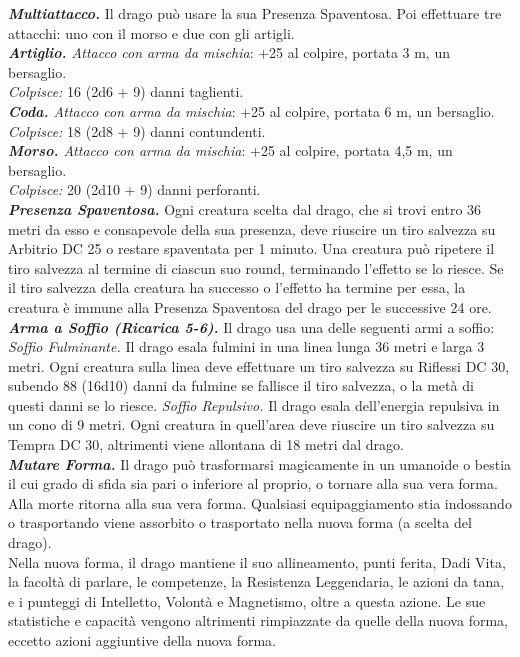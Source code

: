 \begin{multicols}{2}
\emph{\textbf{Multiattacco.}} Il drago può usare la sua Presenza Spaventosa. Poi effettuare tre attacchi: uno con il morso e due con gli artigli.\\
\emph{\textbf{Artiglio.} Attacco con arma da mischia}: +25 al colpire, portata 3 m, un bersaglio.\\
\emph{Colpisce:} 16 (2d6 + 9) danni taglienti.\\
\emph{\textbf{Coda.} Attacco con arma da mischia}: +25 al colpire, portata 6 m, un bersaglio.\\
\emph{Colpisce:} 18 (2d8 + 9) danni contundenti.\\
\emph{\textbf{Morso.} Attacco con arma da mischia}: +25 al colpire, portata 4,5 m, un bersaglio.\\
\emph{Colpisce:} 20 (2d10 + 9) danni perforanti.\\
\emph{\textbf{Presenza Spaventosa.}} Ogni creatura scelta dal drago, che si trovi entro 36 metri da esso e consapevole della sua presenza, deve riuscire un tiro salvezza su Arbitrio DC  25 o restare spaventata per 1 minuto. Una creatura può ripetere il tiro salvezza al termine di ciascun suo round, terminando l'effetto se lo riesce. Se il tiro salvezza della creatura ha successo o l'effetto ha termine per essa, la creatura è immune alla Presenza Spaventosa del drago per le successive 24 ore.\\
\emph{\textbf{Arma a Soffio (Ricarica 5-6).}} Il drago usa una delle seguenti armi a soffio:\\
\emph{Soffio Fulminante.} Il drago esala fulmini in una linea lunga 36 metri e larga 3 metri. Ogni creatura sulla linea deve effettuare un tiro salvezza su Riflessi DC  30, subendo 88 (16d10) danni da fulmine se fallisce il tiro salvezza, o la metà di questi danni se lo riesce. \emph{Soffio Repulsivo.} Il drago esala dell'energia repulsiva in un cono di 9 metri. Ogni creatura in quell'area deve riuscire un tiro salvezza su Tempra DC  30, altrimenti viene allontana di 18 metri dal drago.\\
\emph{\textbf{Mutare Forma.}} Il drago può trasformarsi magicamente in un umanoide o bestia il cui grado di sfida sia pari o inferiore al proprio, o tornare alla sua vera forma. Alla morte ritorna alla sua vera forma. Qualsiasi equipaggiamento stia indossando o trasportando viene assorbito o trasportato nella nuova forma (a scelta del drago).\\
Nella nuova forma, il drago mantiene il suo allineamento, punti ferita, Dadi Vita, la facoltà di parlare, le competenze, la Resistenza Leggendaria, le azioni da tana, e i punteggi di Intelletto, Volontà e Magnetismo, oltre a questa azione. Le sue statistiche e capacità vengono altrimenti rimpiazzate da quelle della nuova forma, eccetto azioni aggiuntive della nuova forma.\\

\end{multicols}
